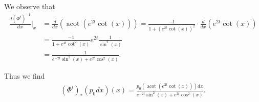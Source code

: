 \documentclass[12pt]{amsart}
\DeclareMathOperator{\acot}{acot}
\begin{document}
We observe that
\begin{align*}
  \frac{d (\Phi^t)^{-1}}{dx}|_x &= \frac{d}{dx} \left( \acot( e^{2t} \cot(x) ) \right) = \frac{-1}{1+ (e^{2t} \cot(x))^2} \cdot \frac{d}{dx} \left( e^{2t}   \cot(x) \right) \\
  &= \frac{-1}{1 + e^{4t} \cot^2(x)} e^{2t} \frac{1}{\sin^2(x)} \\
  &= \frac{1}{ e^{-2t} \sin^2(x) + e^{2t} \cos^2(x) }.
\end{align*}

Thus we find
\begin{align*}
  (\Phi^t)_* ( p_0 dx) (x) = \frac{p_0( \acot( e^{2t} \cot(x) ) ) dx}{
    e^{-2t} \sin^2(x) + e^{2t} \cos^2(x) }.
\end{align*}




\end{document}
